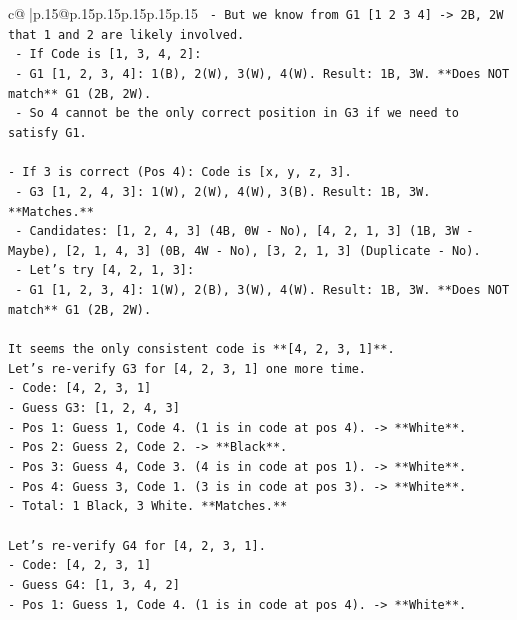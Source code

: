 \documentclass{article}
\begin{document}
{\begin{supertabular}{c@{$\;$}|p{.15\linewidth}@{}p{.15\linewidth}p{.15\linewidth}p{.15\linewidth}p{.15\linewidth}p{.15\linewidth}}
{{{\texttt{  {-} But we know from G1 {[}1 2 3 4{]} {-}> 2B, 2W that 1 and 2 are likely involved.} \\
\texttt{  {-} If Code is {[}1, 3, 4, 2{]}:} \\
\texttt{    {-} G1 {[}1, 2, 3, 4{]}: 1(B), 2(W), 3(W), 4(W). Result: 1B, 3W. **Does NOT match** G1 (2B, 2W).} \\
\texttt{  {-} So 4 cannot be the only correct position in G3 if we need to satisfy G1.} \\
\\ 
\texttt{{-} If 3 is correct (Pos 4): Code is {[}x, y, z, 3{]}.} \\
\texttt{  {-} G3 {[}1, 2, 4, 3{]}: 1(W), 2(W), 4(W), 3(B). Result: 1B, 3W. **Matches.**} \\
\texttt{  {-} Candidates: {[}1, 2, 4, 3{]} (4B, 0W {-} No), {[}4, 2, 1, 3{]} (1B, 3W {-} Maybe), {[}2, 1, 4, 3{]} (0B, 4W {-} No), {[}3, 2, 1, 3{]} (Duplicate {-} No).} \\
\texttt{  {-} Let's try {[}4, 2, 1, 3{]}:} \\
\texttt{    {-} G1 {[}1, 2, 3, 4{]}: 1(W), 2(B), 3(W), 4(W). Result: 1B, 3W. **Does NOT match** G1 (2B, 2W).} \\
\\ 
\texttt{It seems the only consistent code is **{[}4, 2, 3, 1{]}**.} \\
\texttt{Let's re{-}verify G3 for {[}4, 2, 3, 1{]} one more time.} \\
\texttt{{-} Code: {[}4, 2, 3, 1{]}} \\
\texttt{{-} Guess G3: {[}1, 2, 4, 3{]}} \\
\texttt{{-} Pos 1: Guess 1, Code 4. (1 is in code at pos 4). {-}> **White**.} \\
\texttt{{-} Pos 2: Guess 2, Code 2. {-}> **Black**.} \\
\texttt{{-} Pos 3: Guess 4, Code 3. (4 is in code at pos 1). {-}> **White**.} \\
\texttt{{-} Pos 4: Guess 3, Code 1. (3 is in code at pos 3). {-}> **White**.} \\
\texttt{{-} Total: 1 Black, 3 White. **Matches.**} \\
\\ 
\texttt{Let's re{-}verify G4 for {[}4, 2, 3, 1{]}.} \\
\texttt{{-} Code: {[}4, 2, 3, 1{]}} \\
\texttt{{-} Guess G4: {[}1, 3, 4, 2{]}} \\
\texttt{{-} Pos 1: Guess 1, Code 4. (1 is in code at pos 4). {-}> **White**.} \\
}}}
\end{supertabular}}
\end{document}
